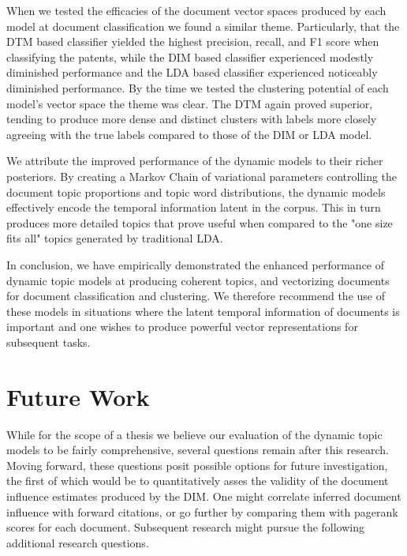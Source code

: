 When we tested the efficacies of the document vector spaces produced by each model at document classification we found a similar theme. Particularly, that the DTM based classifier yielded the highest precision, recall, and F1 score when classifying the patents, while the DIM based classifier experienced modestly diminished performance and the LDA based classifier experienced noticeably diminished performance. By the time we tested the clustering potential of each model's vector space the theme was clear. The DTM again proved superior, tending to produce more dense and distinct clusters with labels more closely agreeing with the true labels compared to those of the DIM or LDA model.

We attribute the improved performance of the dynamic models to their richer posteriors. By creating a Markov Chain of variational parameters controlling the document topic proportions and topic word distributions, the dynamic models effectively encode the temporal information latent in the corpus. This in turn produces more detailed topics that prove useful when compared to the "one size fits all" topics generated by traditional LDA.

In conclusion, we have empirically demonstrated the enhanced performance of dynamic topic models at producing coherent topics, and vectorizing documents for document classification and clustering. We therefore recommend the use of these models in situations where the latent temporal information of documents is important and one wishes to produce powerful vector representations for subsequent tasks.

\section{Future Work}
While for the scope of a thesis we believe our evaluation of the dynamic topic models to be fairly comprehensive, several questions remain after this research. Moving forward, these questions posit possible options for future investigation, the first of which would be to quantitatively asses the validity of the document influence estimates produced by the DIM. One might correlate inferred document influence with forward citations, or go further by comparing them with pagerank scores for each document. Subsequent research might pursue the following additional research questions.

